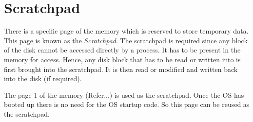 \documentclass[10pt]{report}
\begin{document}
\section{Scratchpad}
There is a specific page of the memory which is reserved to store temporary data. This page is known as the \textit{Scratchpad}. The scratchpad is required since any block of the disk cannot be accessed directly  by a process. It has to be present in the memory for access. Hence, any disk block that has to be read or written into is first brought into the scratchpad. It is then read or modified and written back into the disk (if required).

The page 1 of the memory (Refer...) is used as the scratchpad. Once the OS has booted up there is no need for the OS startup code. So this page can be reused as the scratchpad.
\end{document}
